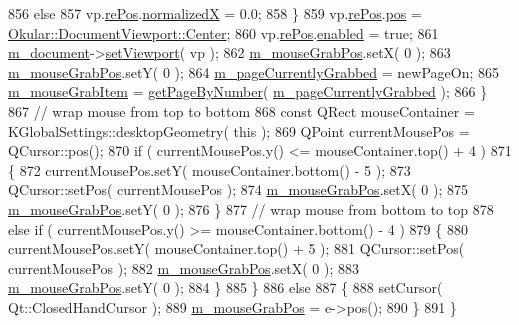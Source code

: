 \begin{DoxyCode}
856                 \textcolor{keywordflow}{else}
857                     vp.\hyperlink{classOkular_1_1DocumentViewport_a054f24bcba44b795a3671ac53693ff45}{rePos}.\hyperlink{classOkular_1_1DocumentViewport_a2f749d09360cca2f64af1a893a190e2f}{normalizedX} = 0.0;
858             \}
859             vp.\hyperlink{classOkular_1_1DocumentViewport_a054f24bcba44b795a3671ac53693ff45}{rePos}.\hyperlink{classOkular_1_1DocumentViewport_a013c8cd543d57045791fe054da340a0e}{pos} = \hyperlink{classOkular_1_1DocumentViewport_aad7228ed215e5a676cf50dabd4e41552a254c6d87e8ba55bb53347ff32e501167}{Okular::DocumentViewport::Center};
860             vp.\hyperlink{classOkular_1_1DocumentViewport_a054f24bcba44b795a3671ac53693ff45}{rePos}.\hyperlink{classOkular_1_1DocumentViewport_a6dddb31dbc72d7fb3efe094d840d8692}{enabled} = \textcolor{keyword}{true};
861             \hyperlink{classThumbnailListPrivate_ae19b3e09f87437e8d485d0e039a52b08}{m\_document}->\hyperlink{classOkular_1_1Document_a1afaf8b8b5cb1e715949024fb75bb767}{setViewport}( vp );
862             \hyperlink{classThumbnailListPrivate_a0ee603709d00ac6ecfbf3298baabdd20}{m\_mouseGrabPos}.setX( 0 );
863             \hyperlink{classThumbnailListPrivate_a0ee603709d00ac6ecfbf3298baabdd20}{m\_mouseGrabPos}.setY( 0 );
864             \hyperlink{classThumbnailListPrivate_ae5c0eb0176feb0e7d25177d81ff2d483}{m\_pageCurrentlyGrabbed} = newPageOn;
865             \hyperlink{classThumbnailListPrivate_afd4652d135d2e87a4e10774e9cd73694}{m\_mouseGrabItem} = \hyperlink{classThumbnailListPrivate_a418e2cdc581a80762739e6d2f1ab3658}{getPageByNumber}( 
      \hyperlink{classThumbnailListPrivate_ae5c0eb0176feb0e7d25177d81ff2d483}{m\_pageCurrentlyGrabbed} );
866         \}
867         \textcolor{comment}{// wrap mouse from top to bottom}
868         \textcolor{keyword}{const} QRect mouseContainer = KGlobalSettings::desktopGeometry( \textcolor{keyword}{this} );
869         QPoint currentMousePos = QCursor::pos();
870         \textcolor{keywordflow}{if} ( currentMousePos.y() <= mouseContainer.top() + 4 )
871         \{
872             currentMousePos.setY( mouseContainer.bottom() - 5 );
873             QCursor::setPos( currentMousePos );
874             \hyperlink{classThumbnailListPrivate_a0ee603709d00ac6ecfbf3298baabdd20}{m\_mouseGrabPos}.setX( 0 );
875             \hyperlink{classThumbnailListPrivate_a0ee603709d00ac6ecfbf3298baabdd20}{m\_mouseGrabPos}.setY( 0 );
876         \}
877         \textcolor{comment}{// wrap mouse from bottom to top}
878         \textcolor{keywordflow}{else} \textcolor{keywordflow}{if} ( currentMousePos.y() >= mouseContainer.bottom() - 4 )
879         \{
880             currentMousePos.setY( mouseContainer.top() + 5 );
881             QCursor::setPos( currentMousePos );
882             \hyperlink{classThumbnailListPrivate_a0ee603709d00ac6ecfbf3298baabdd20}{m\_mouseGrabPos}.setX( 0 );
883             \hyperlink{classThumbnailListPrivate_a0ee603709d00ac6ecfbf3298baabdd20}{m\_mouseGrabPos}.setY( 0 );
884         \}
885     \}
886     \textcolor{keywordflow}{else}
887     \{
888         setCursor( Qt::ClosedHandCursor );
889         \hyperlink{classThumbnailListPrivate_a0ee603709d00ac6ecfbf3298baabdd20}{m\_mouseGrabPos} = e->pos();
890     \}
891 \}
\end{DoxyCode}

